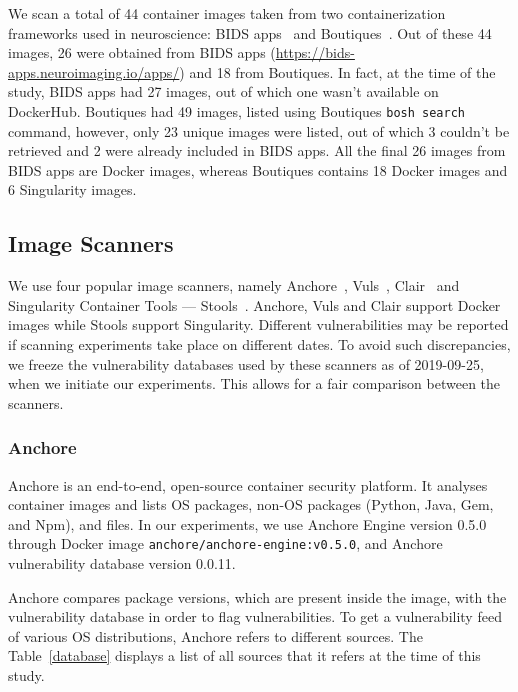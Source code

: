 \documentclass[a4paper,num-refs]{oup-contemporary}
\begin{document}
We scan a total of 44 container images taken from two containerization frameworks
used in neuroscience: BIDS
apps~\cite{gorgolewski2017bids} and Boutiques~\cite{glatard2018boutiques}.
Out of these 44 images, 26 were obtained from BIDS apps
(\url{https://bids-apps.neuroimaging.io/apps/}) 
and 18 from Boutiques. In fact, at the time of the study, BIDS apps had 27 images,
out of which one wasn't available on DockerHub. Boutiques had 49 images, listed using
Boutiques \texttt{bosh search} command,
however, only 23 unique images were listed, out of which 3 couldn't be retrieved and 2
were already included in BIDS apps. All the final 26 images
from BIDS apps are Docker images, whereas Boutiques contains 18 Docker images
and 6 Singularity images.

\subsection{Image Scanners}

We use four popular image scanners, namely Anchore~\cite{github_2019},
Vuls~\cite{future-architect_2019}, Clair~\cite{arminc_2019} and
Singularity Container Tools --- Stools~\cite{stools}. Anchore, Vuls and Clair support Docker
images while Stools support Singularity. Different vulnerabilities may be
reported if scanning experiments take place on different dates.
To avoid such discrepancies, we freeze the vulnerability
databases used by these scanners as of 2019-09-25, when we initiate our
experiments. This allows for a fair comparison between the scanners.

\subsubsection{Anchore}

Anchore is an end-to-end, open-source container security platform. It
analyses container images and lists OS
packages, non-OS packages (Python, Java, Gem, and Npm), and files.
In our experiments, we use Anchore Engine version 0.5.0 through Docker image \texttt{anchore/anchore-engine:v0.5.0}, and
Anchore vulnerability database version 0.0.11.

Anchore compares package versions, which are present inside the
image, with the vulnerability database in order to flag vulnerabilities.
To get a vulnerability feed of various OS distributions, Anchore refers to
different sources. The Table~\ref{database} displays a list of all sources
that it refers at the time of this study.
\end{document}
